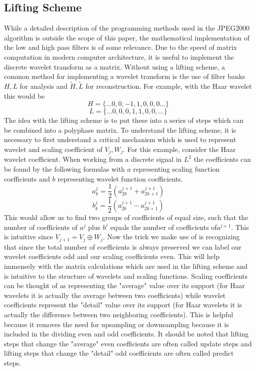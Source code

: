 \documentclass{article}
\begin{document}
\subsection{Lifting Scheme}
While a detailed description of the programming methods used in the JPEG2000 algorithm is outside the scope of this paper, the mathematical implementation of the low and high pass filters is of some relevance. Due to the speed of matrix computation in modern computer architecture, it is useful to implement the discrete wavelet transform as a matrix.\newline
Without using a lifting scheme, a common method for implementing a wavelet transform is the use of filter banks \(H,L\) for analysis and \(\tilde{H}, \tilde{L}\) for reconstruction. For example, with the Haar wavelet this would be
\[H=\{... 0,0,-1,1,0,0,0...\}\]
\[L=\{...0,0,0,1,1,0,0,...\}\]
The idea with the lifting scheme is to put these into a series of steps which can be combined into a polyphase matrix.
To understand the lifting scheme, it is necessary to first understand a critical mechanism which is used to represent wavelet and scaling coefficient of \(V_{j}, W_{j}\). For this example, consider the Haar wavelet coefficient. When working from a discrete signal in \(L^{2}\) the coefficients can be found by the following formulas with \(a\) representing scaling function coefficients and \(b\) representing wavelet function coefficients.
\[a^{j}_{k}=\frac{1}{2}(a^{j+1}_{2k}+a^{j+1}_{2k+1})\]
\[b^{j}_{k}=\frac{1}{2}(a^{j+1}_{2k}-a^{j+1}_{2k+1})\]
This would allow us to find two groups of coefficients of equal size, such that the number of coefficients of \(a^{j}\) plus \(b^{j}\) equals the number of coefficients of\(a^{j+1}\). This is intuitive since \(V_{j+1}=V_{j}\oplus W_{j}\). Now the trick we make use of is recognizing that since the total number of coefficients is always preserved we can label our wavelet coefficients odd and our scaling coefficients even. This will help immensely with the matrix calculations which are used in the lifting scheme and is intuitive to the structure of wavelets and scaling functions. Scaling coefficients can be thought of as representing the "average" value over its support (for Haar wavelets it is actually the average between two coefficients) while wavelet coefficients represent the "detail" value over its support (for Haar wavelets it is actually the difference between two neighboring coefficients). This is helpful because it removes the need for upsampling or downsampling because it is included in the dividing even and odd coefficients. It should be noted that lifting steps that change the "average" even coefficients are often called update steps and lifting steps that change the "detail" odd coefficients are often called predict steps.
\end{document}

